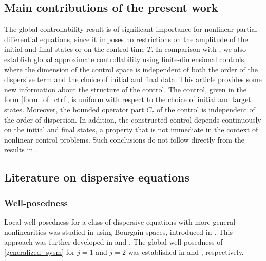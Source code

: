 \documentclass[10pt, reqno]{amsart}
\numberwithin{equation}{section}
\begin{document}
\subsection{Main contributions of the present work} The global controllability result is of significant importance for nonlinear partial differential equations, since it imposes no restrictions on the amplitude of the initial and final states or on the control time $T$. In comparison with \cite{Chen23, Ahamed_Mondal_25}, we also establish global approximate controllability using finite-dimensional controls, where the dimension of the control space is independent of both the order of the dispersive term and the choice of initial and final data. This article provides some new information about the structure of the control. The control, given in the form \eqref{form_of_ctrl}, is uniform with respect to the choice of initial and target states. Moreover, the bounded operator part $C_{\tau}$ of the control is independent of the order of dispersion. In addition, the constructed control depends continuously on the initial and final states, a property that is not immediate in the context of nonlinear control problems. Such conclusions do not follow directly from the results in \cite{Chen23, Ahamed_Mondal_25}.

\subsection{Literature on dispersive equations}
\subsubsection{Well-posedness} Local well-posedness for a class of dispersive equations with more general nonlinearities was studied in \cite{Kenig_Ponce_gustavo_1994} using Bourgain spaces, introduced in \cite{Bourgain_1997,Bourgain_1993}. This approach was further developed in \cite{Kenig_Carlos_Ponce_1996} and \cite{Tao_2001}. The global well-posedness of \eqref{generalized_sysm} for $j=1$ and $j=2$ was established in \cite{Coliander_Keel_Staffilani_Tao_2003} and \cite{Kato_2012}, respectively.
\end{document}
